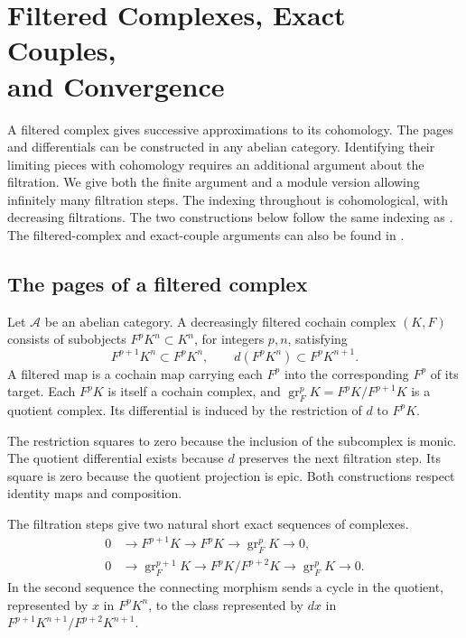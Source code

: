 \chapter[Filtered complexes and convergence]
  {Filtered Complexes, Exact Couples,\\and Convergence}
\label{ch:filtrations}

A filtered complex gives successive approximations to its cohomology.
The pages and differentials can be constructed in any abelian category.
Identifying their limiting pieces with cohomology requires an additional
argument about the filtration. We give both the finite argument and a
module version allowing infinitely many filtration steps. The indexing
throughout is cohomological, with decreasing filtrations. The two
constructions below follow the same indexing as
\cite[Sections 12.21 and 12.24]{stacks-homology}. The filtered-complex
and exact-couple arguments can also be found in
\cite[Sections 5.4, 5.5, and 5.9]{weibel}.

\section{The pages of a filtered complex}

\begin{definition}
\label{res:F01}
Let $\mathcal A$ be an abelian category. A decreasingly filtered cochain
complex $(K,F)$ consists of subobjects $F^pK^n\subset K^n$, for integers
$p,n$, satisfying
\[
 F^{p+1}K^n\subset F^pK^n,\qquad
 d(F^pK^n)\subset F^pK^{n+1}.
\]
A filtered map is a cochain map carrying each $F^p$ into the corresponding
$F^p$ of its target. Each $F^pK$ is itself a cochain complex, and
$\operatorname{gr}_F^pK=F^pK/F^{p+1}K$ is a quotient complex. Its differential
is induced by the restriction of $d$ to $F^pK$.
\end{definition}

The restriction squares to zero because the inclusion of the subcomplex
is monic. The quotient differential exists because $d$ preserves the
next filtration step. Its square is zero because the quotient projection
is epic. Both constructions respect identity maps and composition.

\begin{lemma}
\label{res:F02}
The filtration steps give two natural short exact sequences of complexes.
\begin{align*}
 0&\longrightarrow F^{p+1}K\longrightarrow F^pK
    \longrightarrow \operatorname{gr}_F^pK\longrightarrow 0,\\
 0&\longrightarrow \operatorname{gr}_F^{p+1}K
    \longrightarrow F^pK/F^{p+2}K
    \longrightarrow \operatorname{gr}_F^pK\longrightarrow 0 .
\end{align*}
In the second sequence the connecting morphism sends a cycle in the
quotient, represented by $x$ in $F^pK^n$, to the class represented by
$dx$ in $F^{p+1}K^{n+1}/F^{p+2}K^{n+1}$.
\end{lemma}

